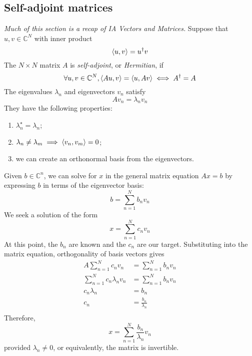 \subsection{Self-adjoint matrices}
\textit{Much of this section is a recap of IA Vectors and Matrices.}
Suppose that \( u, v \in \mathbb C^N \) with inner product
\[
	\left\langle{u,v}\right\rangle = u^\dagger v
\]
The \( N \times N \) matrix \( A \) is \textit{self-adjoint}, or \textit{Hermitian}, if
\[
	\forall u,v \in \mathbb C^N, \left\langle{Au, v}\right\rangle = \left\langle{u, Av}\right\rangle \iff A^\dagger = A
\]
The eigenvalues \( \lambda_n \) and eigenvectors \( v_n \) satisfy
\[
	A v_n = \lambda_n v_n
\]
They have the following properties:
\begin{enumerate}
	\item \( \lambda_n^\star = \lambda_n \);
	\item \( \lambda_n \neq \lambda_m \implies \left\langle{ v_n, v_m }\right\rangle = 0 \);
	\item we can create an orthonormal basis from the eigenvectors.
\end{enumerate}
Given \( b \in \mathbb C^n \), we can solve for \( x \) in the general matrix equation \( Ax = b \) by expressing \( b \) in terms of the eigenvector basis:
\[
	b = \sum_{n=1}^N b_n v_n
\]
We seek a solution of the form
\[
	x = \sum_{n=1}^N c_n v_n
\]
At this point, the \( b_n \) are known and the \( c_n \) are our target.
Substituting into the matrix equation, orthogonality of basis vectors gives
\begin{align*}
	A \sum_{n=1}^N c_n v_n         & = \sum_{n=1}^N b_n v_n  \\
	\sum_{n=1}^N c_n \lambda_n v_n & = \sum_{n=1}^N b_n v_n  \\
	c_n \lambda_n                  & = b_n                   \\
	c_n                            & = \frac{b_n}{\lambda_n} \\
\end{align*}
Therefore,
\[
	x = \sum_{n=1}^N \frac{b_n}{\lambda_n} v_n
\]
provided \( \lambda_n \neq 0 \), or equivalently, the matrix is invertible.


